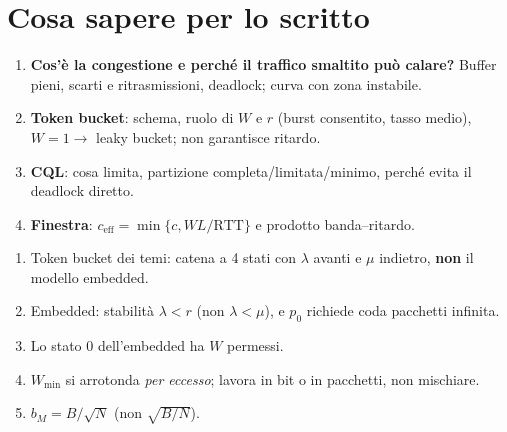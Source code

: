 \section{Cosa sapere per lo scritto}
\begin{procedura}
\begin{enumerate}[leftmargin=*]
\item \textbf{Cos'è la congestione e perché il traffico smaltito può calare?} Buffer pieni, scarti e ritrasmissioni, deadlock; curva con zona instabile.
\item \textbf{Token bucket}: schema, ruolo di $W$ e $r$ (burst consentito, tasso medio), $W=1\to$ leaky bucket; non garantisce ritardo.
\item \textbf{CQL}: cosa limita, partizione completa/limitata/minimo, perché evita il deadlock diretto.
\item \textbf{Finestra}: $c_{\mathrm{eff}}=\min\{c,WL/\mathrm{RTT}\}$ e prodotto banda--ritardo.
\end{enumerate}
\end{procedura}

\begin{attenzione}
\begin{enumerate}[leftmargin=*,nosep]
\item Token bucket dei temi: catena a 4 stati con $\lambda$ avanti e $\mu$ indietro, \textbf{non} il modello embedded.
\item Embedded: stabilità $\lambda<r$ (non $\lambda<\mu$), e $p_0$ richiede coda pacchetti infinita.
\item Lo stato 0 dell'embedded ha $W$ permessi.
\item $W_{\min}$ si arrotonda \emph{per eccesso}; lavora in bit o in pacchetti, non mischiare.
\item $b_M=B/\sqrt N$ (non $\sqrt{B/N}$).
\end{enumerate}
\end{attenzione}
